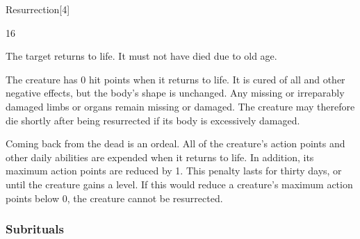 \begin{spellsection}{Resurrection}[4]

\begin{spellcontent}

\begin{spelltargetinginfo}


 16
\end{spelltargetinginfo}


\begin{spelleffects}



\spelleffect
The target returns to life.
It must not have died due to old age.

The creature has 0 hit points when it returns to life.
It is cured of all  and other negative effects, but the body's shape is unchanged.
Any missing or irreparably damaged limbs or organs remain missing or damaged.
The creature may therefore die shortly after being resurrected if its body is excessively damaged.

Coming back from the dead is an ordeal.
All of the creature's action points and other daily abilities are expended when it returns to life.
In addition, its maximum action points are reduced by 1.
This penalty lasts for thirty days, or until the creature gains a level.
If this would reduce a creature's maximum action points below 0, the creature cannot be resurrected.








\end{spelleffects}

\end{spellcontent}
\begin{spellfooter}


\end{spellfooter}
\begin{spellsubcontent}


\end{spellsubcontent}
\end{spellsection}


\subsubsection{Subrituals}



